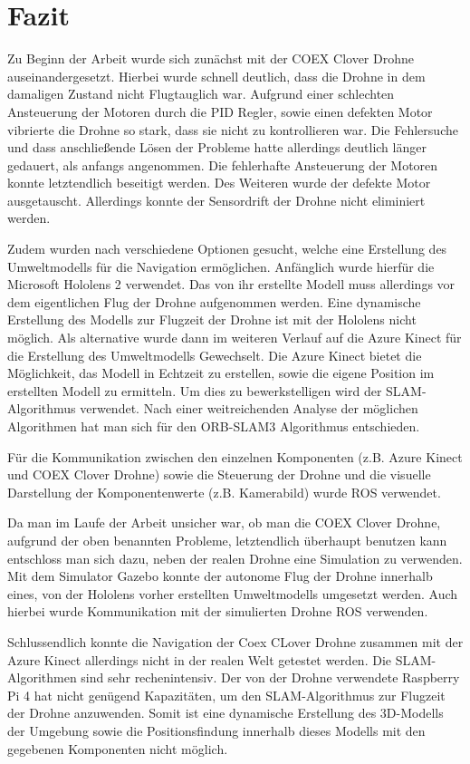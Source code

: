 \chapter{Fazit}
Zu Beginn der Arbeit wurde sich zunächst mit der COEX Clover Drohne auseinandergesetzt. Hierbei wurde schnell deutlich, dass die Drohne in dem damaligen Zustand nicht Flugtauglich war. Aufgrund einer schlechten Ansteuerung der Motoren durch die \ac{PID} Regler, sowie einen defekten Motor vibrierte die Drohne so stark, dass sie nicht zu kontrollieren war. Die Fehlersuche und dass anschließende Lösen der Probleme hatte allerdings deutlich länger gedauert, als anfangs angenommen. Die fehlerhafte Ansteuerung der Motoren konnte letztendlich beseitigt werden. Des Weiteren wurde der defekte Motor ausgetauscht. Allerdings konnte der Sensordrift der Drohne nicht eliminiert werden.

Zudem wurden nach verschiedene Optionen gesucht, welche eine Erstellung des Umweltmodells für die Navigation ermöglichen. Anfänglich wurde hierfür die Microsoft Hololens 2 verwendet. Das von ihr erstellte Modell muss allerdings vor dem eigentlichen Flug der Drohne aufgenommen werden. Eine dynamische Erstellung des Modells zur Flugzeit der Drohne ist mit der Hololens nicht möglich. Als alternative wurde dann im weiteren Verlauf auf die Azure Kinect für die Erstellung des Umweltmodells
Gewechselt. Die Azure Kinect bietet die Möglichkeit, das Modell in Echtzeit zu erstellen, sowie die eigene Position im erstellten Modell zu ermitteln. Um dies zu bewerkstelligen wird der SLAM-Algorithmus verwendet. Nach einer weitreichenden Analyse der möglichen Algorithmen hat man sich für den ORB-SLAM3 Algorithmus entschieden.

Für die Kommunikation zwischen den einzelnen Komponenten (z.B. Azure Kinect und COEX Clover Drohne) sowie die Steuerung der Drohne und die visuelle Darstellung der Komponentenwerte (z.B. Kamerabild) wurde \ac{ROS} verwendet.

Da man im Laufe der Arbeit unsicher war, ob man die COEX Clover Drohne, aufgrund der oben benannten Probleme, letztendlich überhaupt benutzen kann entschloss man sich dazu, neben der realen Drohne eine Simulation zu verwenden. Mit dem Simulator Gazebo konnte der autonome Flug der Drohne innerhalb eines, von der Hololens vorher erstellten Umweltmodells umgesetzt werden. Auch hierbei wurde Kommunikation mit der simulierten Drohne \ac{ROS} verwenden.


Schlussendlich konnte die Navigation der Coex CLover Drohne zusammen mit der Azure Kinect allerdings nicht in der realen Welt getestet werden. Die SLAM-Algorithmen sind sehr rechenintensiv. Der von der Drohne verwendete Raspberry Pi 4 hat nicht genügend Kapazitäten, um den SLAM-Algorithmus zur Flugzeit der Drohne anzuwenden. Somit ist eine dynamische Erstellung des 3D-Modells der Umgebung sowie die Positionsfindung innerhalb dieses Modells mit den gegebenen Komponenten nicht möglich.



